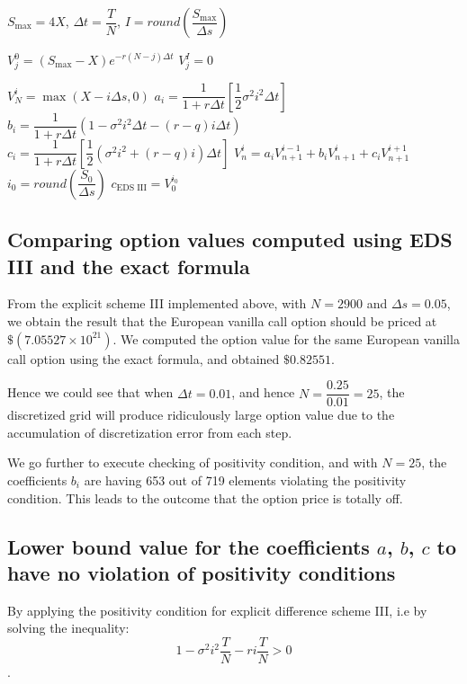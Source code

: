 \begin{algorithm}[H]
	$S_{\max} = 4X$, 
	$\Delta t = \dfrac{T}{N}$, 
	$I = round \left ( \dfrac{S_{\max}}{\Delta s} \right)$\;
	
	 {
		$V^{0}_{j} = (S_{\max} - X)e^{-r(N-j) \Delta t}$\;
		$V^{I}_{j} = 0$\;
	}
	
	 {
		$V^{i}_{N} = \max(X - i\Delta s, 0)$\;
		$a_i = \dfrac{1}{1 + r \Delta t} \left [\dfrac{1}{2} \sigma^2 i^2 \Delta t \right ]$\;
		$b_i = \dfrac{1}{1 + r \Delta t} \left (1 - \sigma^2 i^2 \Delta t - (r-q) i \Delta t \right )$\;
		$c_i = \dfrac{1}{1 + r \Delta t} \left [ \dfrac{1}{2} ( \sigma^2 i^2 + (r-q)i) \Delta t \right ]$\;
		 {
			$V_n^i = a_i V^{i - 1}_{n+1} + b_i V^i_{n+1} + c_i V^{i+1}_{n+1}$ \;
		}
	}
	$i_0 = round \left (\dfrac{S_0}{\Delta s} \right )$\;
	$c_{\text{EDS III}} = V_0^{i_0}$\;
	
\end{algorithm}

\subsection{Comparing option values computed using EDS III and the exact formula}
From the explicit scheme III implemented above, with $N = 2900$ and $\Delta s = 0.05$, we obtain the result that the European vanilla call option should be priced at $\$(7.05527 \times 10^{21})$. We computed the option value for the same European vanilla call option using the exact formula, and obtained $\$0.82551$. 

Hence we could see that when $\Delta t = 0.01$, and hence $N = \dfrac{0.25}{0.01} = 25$, the discretized grid will produce ridiculously large option value due to the accumulation of discretization error from each step.

We go further to execute checking of positivity condition, and with $N = 25$, the coefficients $b_i$ are having 653 out of 719 elements violating the positivity condition. This leads to the outcome that the option price is totally off.

\subsection{Lower bound value for the coefficients $a$, $b$, $c$ to have no violation of positivity conditions}
By applying the positivity condition for explicit difference scheme III, i.e by solving the inequality: $$1 - \sigma^2 i^2 \dfrac{T}{N} - ri \dfrac{T}{N} > 0$$.

